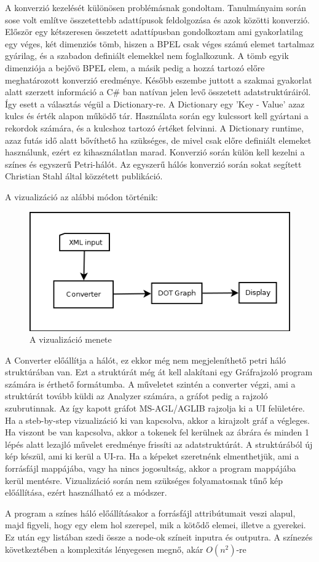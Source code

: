 A konverzió kezelését különösen problémásnak gondoltam. Tanulmányaim során sose volt említve összetettebb adattípusok feldolgozása és azok közötti konverzió. Először egy kétszeresen összetett adattípusban gondolkoztam ami gyakorlatilag egy véges, két dimenziós tömb, hiszen a BPEL csak véges számú elemet tartalmaz gyárilag, és a szabadon definiált elemekkel nem foglalkozunk. A tömb egyik dimenziója a bejővö BPEL elem, a másik pedig a hozzá tartozó előre meghatározott konverzió eredménye. Később eszembe juttott a szakmai gyakorlat alatt szerzett információ a C\# ban natívan jelen levő összetett adatstruktúráiról. Így esett a választás végül a Dictionary-re. A Dictionary egy 'Key - Value' azaz kulcs és érték alapon működő tár. Használata során egy kulcssort kell gyártani a rekordok számára, és a kulcshoz tartozó értéket felvinni. A Dictionary runtime, azaz futás idő alatt bővíthető ha szükséges, de mivel csak előre definiált elemeket használunk, ezért ez kihasználatlan marad. Konverzió során külön kell kezelni a színes és egyszerű Petri-hálót. Az egyszerű hálós konverzió során sokat segített Christian Stahl által közzétett publikáció\cite{bpelToPnet}.

A vizualizáció az alábbi módon történik:
\begin{figure}[h!]
\centering
\includegraphics[scale=0.6]{images/graphdisplay.png}
\caption{A vizualizáció menete}
\label{fig:graphdisplay}
\end{figure}

A Converter előállítja a hálót, ez ekkor még nem megjeleníthető petri háló struktúrában van. Ezt a struktúrát még át kell alakítani egy Gráfrajzoló program számára is érthető formátumba. A műveletet szintén a converter végzi, ami a struktúrát tovább küldi az Analyzer számára, a gráfot pedig a rajzoló szubrutinnak. Az így kapott gráfot MS-AGL/AGLIB rajzolja ki a UI felületére. Ha a steb-by-step vizualizáció ki van kapcsolva, akkor a kirajzolt gráf a végleges. Ha viszont be van kapcsolva, akkor a tokenek fel kerülnek az ábrára és minden 1 lépés alatt lezajló művelet eredménye frissíti az adatstruktúrát. A struktúrából új kép készül, ami ki kerül a UI-ra. Ha a képeket szeretnénk elmenthetjük, ami a forrásfájl mappájába, vagy ha nincs jogosultság, akkor a program mappájába kerül mentésre. Vizualizáció során nem szükséges folyamatosnak tűnő kép előállítása, ezért használható ez a módszer. 

A program a színes háló előállításakor a forrásfájl attribútumait veszi alapul, majd figyeli, hogy egy elem hol szerepel, mik a kötődő elemei, illetve a gyerekei. Ez után egy listában szedi össze a node-ok színeit inputra és outputra. A színezés következtében a komplexitás lényegesen megnő, akár $O(n^2)$-re